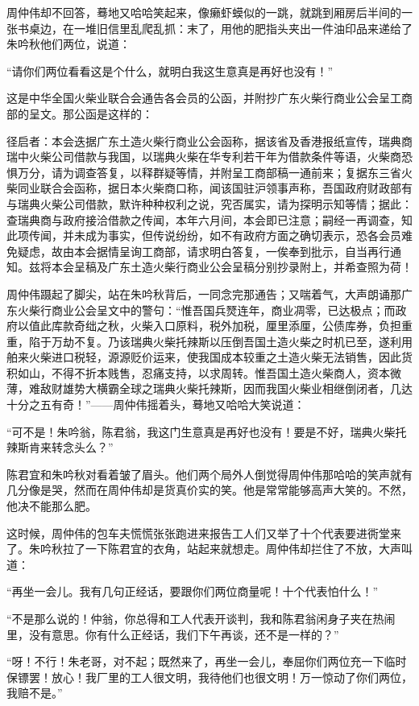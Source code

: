 \par 周仲伟却不回答，蓦地又哈哈笑起来，像癞虾蟆似的一跳，就跳到厢房后半间的一张书桌边，在一堆旧信里乱爬乱抓：末了，用他的肥指头夹出一件油印品来递给了朱吟秋他们两位，说道：
\par “请你们两位看看这是个什么，就明白我这生意真是再好也没有！”
\par 这是中华全国火柴业联合会通告各会员的公函，并附抄广东火柴行商业公会呈工商部的呈文。那公函是这样的：
\par 径启者：本会迭据广东土造火柴行商业公会函称，据该省及香港报纸宣传，瑞典商瑞中火柴公司借款与我国，以瑞典火柴在华专利若干年为借款条件等语，火柴商恐惧万分，请为调查答复，以释群疑等情，并附呈工商部稿一通前来；复据东三省火柴同业联合会函称，据日本火柴商口称，闻该国驻沪领事声称，吾国政府财政部有与瑞典火柴公司借款，默许种种权利之说，究否属实，请为探明示知等情；据此：查瑞典商与政府接洽借款之传闻，本年六月间，本会即已注意；嗣经一再调查，知此项传闻，并未成为事实，但传说纷纷，如不有政府方面之确切表示，恐各会员难免疑虑，故由本会据情呈询工商部，请求明白答复，一俟奉到批示，自当再行通知。兹将本会呈稿及广东土造火柴行商业公会呈稿分别抄录附上，并希查照为荷！
\par 周仲伟蹑起了脚尖，站在朱吟秋背后，一同念完那通告；又喘着气，大声朗诵那广东火柴行商业公会呈文中的警句：“惟吾国兵燹连年，商业凋零，已达极点；而政府以值此库款奇绌之秋，火柴入口原料，税外加税，厘里添厘，公债库券，负担重重，陷于万劫不复。乃该瑞典火柴托辣斯以压倒吾国土造火柴之时机已至，遂利用舶来火柴进口税轻，源源贬价运来，使我国成本较重之土造火柴无法销售，因此货积如山，不得不折本贱售，忍痛支持，以求周转。惟吾国土造火柴商人，资本微薄，难敌财雄势大横霸全球之瑞典火柴托辣斯，因而我国火柴业相继倒闭者，几达十分之五有奇！”——周仲伟摇着头，蓦地又哈哈大笑说道：
\par “可不是！朱吟翁，陈君翁，我这门生意真是再好也没有！要是不好，瑞典火柴托辣斯肯来转念头么？”
\par 陈君宜和朱吟秋对看着皱了眉头。他们两个局外人倒觉得周仲伟那哈哈的笑声就有几分像是哭，然而在周仲伟却是货真价实的笑。他是常常能够高声大笑的。不然，他决不能那么肥。
\par 这时候，周仲伟的包车夫慌慌张张跑进来报告工人们又举了十个代表要进衖堂来了。朱吟秋拉了一下陈君宜的衣角，站起来就想走。周仲伟却拦住了不放，大声叫道：
\par “再坐一会儿。我有几句正经话，要跟你们两位商量呢！十个代表怕什么！”
\par “不是那么说的！仲翁，你总得和工人代表开谈判，我和陈君翁闲身子夹在热闹里，没有意思。你有什么正经话，我们下午再谈，还不是一样的？”
\par “呀！不行！朱老哥，对不起；既然来了，再坐一会儿，奉屈你们两位充一下临时保镖罢！放心！我厂里的工人很文明，我待他们也很文明！万一惊动了你们两位，我赔不是。”
